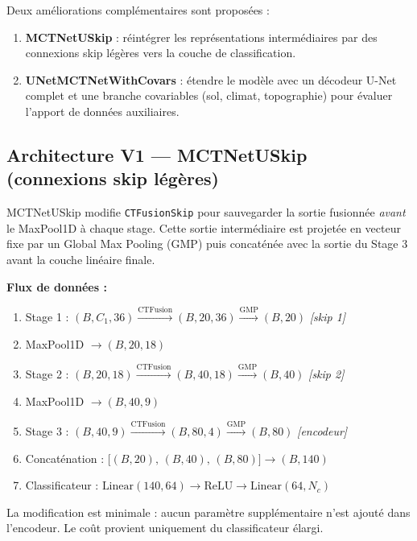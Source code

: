 Deux améliorations complémentaires sont proposées :
\begin{enumerate}
  \item \textbf{MCTNetUSkip} : réintégrer les représentations intermédiaires
        par des connexions skip légères vers la couche de classification.
  \item \textbf{UNetMCTNetWithCovars} : étendre le modèle avec un décodeur
        U-Net complet et une branche covariables (sol, climat, topographie)
        pour évaluer l'apport de données auxiliaires.
\end{enumerate}

\subsection{Architecture V1 — MCTNetUSkip (connexions skip légères)}
\label{subsec:uskip_v1}

MCTNetUSkip modifie \texttt{CTFusionSkip} pour sauvegarder la sortie fusionnée
\emph{avant} le MaxPool1D à chaque stage. Cette sortie intermédiaire est
projetée en vecteur fixe par un Global Max Pooling (GMP) puis concaténée avec
la sortie du Stage 3 avant la couche linéaire finale.

\textbf{Flux de données :}
\begin{enumerate}
  \item Stage 1 : $(B, C_1, 36) \xrightarrow{\text{CTFusion}} (B, 20, 36)
        \xrightarrow{\text{GMP}} (B, 20)$ \quad \textit{[skip 1]}
  \item MaxPool1D $\to (B, 20, 18)$
  \item Stage 2 : $(B, 20, 18) \xrightarrow{\text{CTFusion}} (B, 40, 18)
        \xrightarrow{\text{GMP}} (B, 40)$ \quad \textit{[skip 2]}
  \item MaxPool1D $\to (B, 40, 9)$
  \item Stage 3 : $(B, 40, 9) \xrightarrow{\text{CTFusion}} (B, 80, 4)
        \xrightarrow{\text{GMP}} (B, 80)$ \quad \textit{[encodeur]}
  \item Concaténation : $\big[(B,20),\,(B,40),\,(B,80)\big]
        \to (B, 140)$
  \item Classificateur : $\text{Linear}(140, 64) \to \text{ReLU} \to
        \text{Linear}(64, N_c)$
\end{enumerate}

La modification est minimale : aucun paramètre supplémentaire n'est ajouté
dans l'encodeur. Le coût provient uniquement du classificateur élargi.

